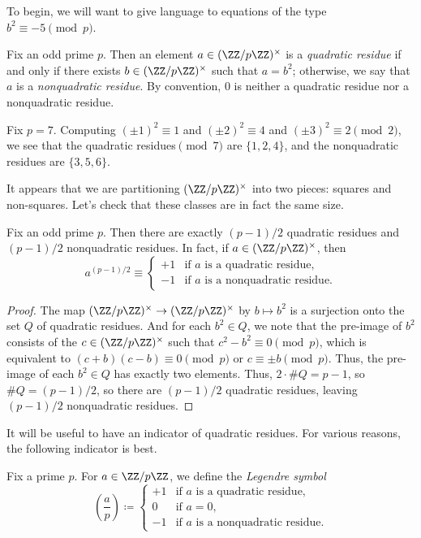 \documentclass[../notes.tex]{subfiles}
\begin{document}
To begin, we will want to give language to equations of the type $b^2\equiv-5\pmod p$.
\begin{definition}
	Fix an odd prime $p$. Then an element $a\in(\ZZ/p\ZZ)^\times$ is a \textit{quadratic residue} if and only if there exists $b\in(\ZZ/p\ZZ)^\times$ such that $a=b^2$; otherwise, we say that $a$ is a \textit{nonquadratic residue}. By convention, $0$ is neither a quadratic residue nor a nonquadratic residue.
\end{definition}
\begin{example} \label{eq:qrs-of-7}
	Fix $p=7$. Computing $(\pm1)^2\equiv1$ and $(\pm2)^2\equiv4$ and $(\pm3)^2\equiv2\pmod2$, we see that the quadratic residues$\pmod7$ are $\{1,2,4\}$, and the nonquadratic residues are $\{3,5,6\}$.
\end{example}
It appears that we are partitioning $(\ZZ/p\ZZ)^\times$ into two pieces: squares and non-squares. Let's check that these classes are in fact the same size.
\begin{lemma} \label{lem:half-qrs}
	Fix an odd prime $p$. Then there are exactly $(p-1)/2$ quadratic residues and $(p-1)/2$ nonquadratic residues. In fact, if $a\in(\ZZ/p\ZZ)^\times$, then
	\[a^{(p-1)/2}\equiv\begin{cases}
		+1 & \text{if }a\text{ is a quadratic residue}, \\
		-1 & \text{if }a\text{ is a nonquadratic residue}.
	\end{cases}\]
\end{lemma}
\begin{proof}
	The map $(\ZZ/p\ZZ)^\times\to(\ZZ/p\ZZ)^\times$ by $b\mapsto b^2$ is a surjection onto the set $Q$ of quadratic residues. And for each $b^2\in Q$, we note that the pre-image of $b^2$ consists of the $c\in(\ZZ/p\ZZ)^\times$ such that $c^2-b^2\equiv0\pmod p$, which is equivalent to $(c+b)(c-b)\equiv0\pmod p$ or $c\equiv\pm b\pmod p$. Thus, the pre-image of each $b^2\in Q$ has exactly two elements. Thus, $2\cdot\#Q=p-1$, so $\#Q=(p-1)/2$, so there are $(p-1)/2$ quadratic residues, leaving $(p-1)/2$ nonquadratic residues.
\end{proof}
It will be useful to have an indicator of quadratic residues. For various reasons, the following indicator is best.
\begin{definition}
	Fix a prime $p$. For $a\in\ZZ/p\ZZ$, we define the \textit{Legendre symbol}
	\[\left(\frac ap\right)\coloneqq\begin{cases}
		+1 & \text{if }a\text{ is a quadratic residue}, \\
		0 & \text{if }a=0, \\
		-1 & \text{if }a\text{ is a nonquadratic residue}.
	\end{cases}\]
\end{definition}
\end{document}
